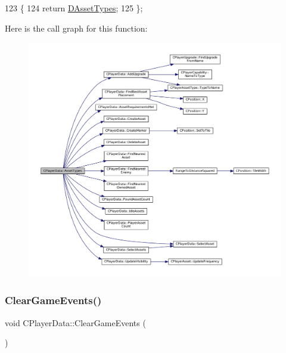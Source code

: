 \begin{DoxyCode}
123                                                                                                        \{
124             \textcolor{keywordflow}{return} \hyperlink{classCPlayerData_ad922f283c60b1c885dac955815ae2b05}{DAssetTypes};
125         \};
\end{DoxyCode}
Here is the call graph for this function\+:\nopagebreak
\begin{figure}[H]
\begin{center}
\leavevmode
\includegraphics[width=350pt]{classCPlayerData_adbe01c300ec2d40267ca84c7529b9045_cgraph}
\end{center}
\end{figure}
\hypertarget{classCPlayerData_a74cbe8bf72037ca113c9c40ae7bca5ec}{}\label{classCPlayerData_a74cbe8bf72037ca113c9c40ae7bca5ec} 
\subsubsection{\texorpdfstring{Clear\+Game\+Events()}{ClearGameEvents()}}
{\footnotesize\ttfamily void C\+Player\+Data\+::\+Clear\+Game\+Events (\begin{DoxyParamCaption}{ }\end{DoxyParamCaption})\hspace{0.3cm}{\ttfamily [inline]}}



